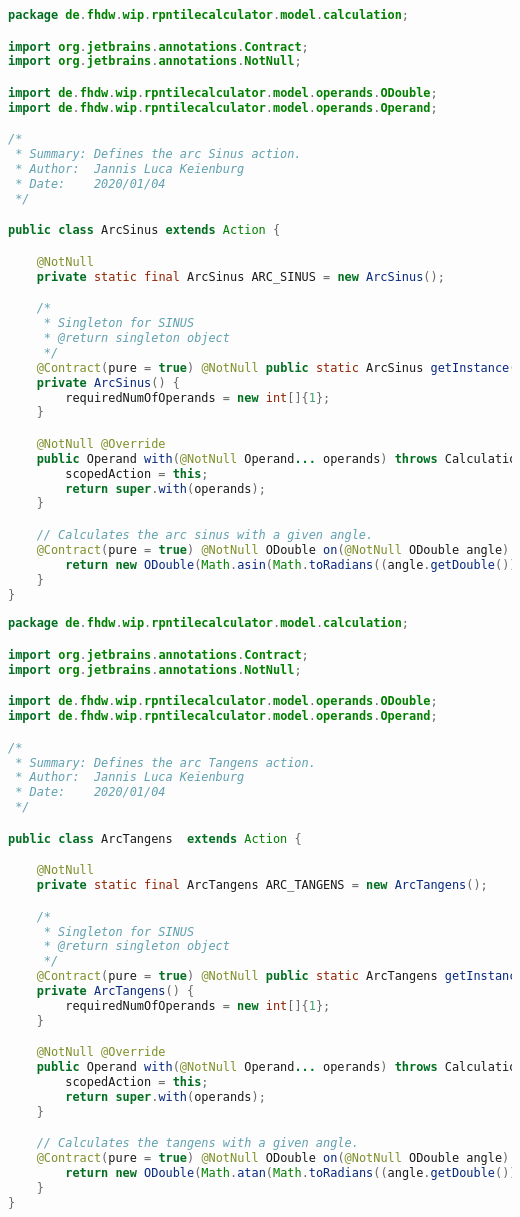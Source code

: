 \begin{lstlisting}[caption=ArcSinus (Keienburg),label=list:ArcSinus,language=Java]
package de.fhdw.wip.rpntilecalculator.model.calculation;

import org.jetbrains.annotations.Contract;
import org.jetbrains.annotations.NotNull;

import de.fhdw.wip.rpntilecalculator.model.operands.ODouble;
import de.fhdw.wip.rpntilecalculator.model.operands.Operand;

/*
 * Summary: Defines the arc Sinus action.
 * Author:  Jannis Luca Keienburg
 * Date:    2020/01/04
 */

public class ArcSinus extends Action {

    @NotNull
    private static final ArcSinus ARC_SINUS = new ArcSinus();

    /*
     * Singleton for SINUS
     * @return singleton object
     */
    @Contract(pure = true) @NotNull public static ArcSinus getInstance() { return ARC_SINUS; }
    private ArcSinus() {
        requiredNumOfOperands = new int[]{1};
    }

    @NotNull @Override
    public Operand with(@NotNull Operand... operands) throws CalculationException {
        scopedAction = this;
        return super.with(operands);
    }

    // Calculates the arc sinus with a given angle.
    @Contract(pure = true) @NotNull ODouble on(@NotNull ODouble angle) {
        return new ODouble(Math.asin(Math.toRadians((angle.getDouble()))));
    }
}
\end{lstlisting}    

\begin{lstlisting}[caption=ArcTangens (Keienburg),label=list:ArcTangens,language=Java]
package de.fhdw.wip.rpntilecalculator.model.calculation;

import org.jetbrains.annotations.Contract;
import org.jetbrains.annotations.NotNull;

import de.fhdw.wip.rpntilecalculator.model.operands.ODouble;
import de.fhdw.wip.rpntilecalculator.model.operands.Operand;

/*
 * Summary: Defines the arc Tangens action.
 * Author:  Jannis Luca Keienburg
 * Date:    2020/01/04
 */

public class ArcTangens  extends Action {

    @NotNull
    private static final ArcTangens ARC_TANGENS = new ArcTangens();

    /*
     * Singleton for SINUS
     * @return singleton object
     */
    @Contract(pure = true) @NotNull public static ArcTangens getInstance() { return ARC_TANGENS; }
    private ArcTangens() {
        requiredNumOfOperands = new int[]{1};
    }

    @NotNull @Override
    public Operand with(@NotNull Operand... operands) throws CalculationException {
        scopedAction = this;
        return super.with(operands);
    }

    // Calculates the tangens with a given angle.
    @Contract(pure = true) @NotNull ODouble on(@NotNull ODouble angle) {
        return new ODouble(Math.atan(Math.toRadians((angle.getDouble()))));
    }
}
\end{lstlisting}    

